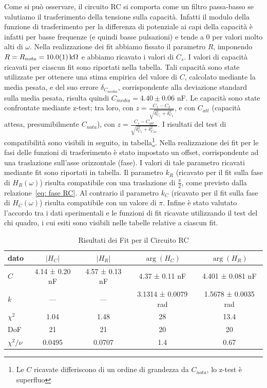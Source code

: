 \documentclass[a4paper]{article}
\begin{document}
Come si può osservare, il circuito RC si comporta come un filtro passa-basso se valutiamo il trasferimento della tensione sulla capacità.
Infatti il modulo della funzione di trasferimento per la differenza di potenziale ai capi della capacità è infatti per basse frequenze (e quindi basse pulsazioni) e tende a 0 per valori molto alti di $\omega$.
Nella realizzazione dei fit abbiamo fissato il parametro $R$, imponendo $R = R_{nota} = \SI{10.0 \pm 0.1}{k\ohm}$ e abbiamo ricavato i valori di $C_s$. 
I valori di capacità ricavati per ciascun fit sono riportati nella tabella.
Tali capacità sono state utilizzate per ottenere una stima empirica del valore di $C$, calcolato mediante la media pesata, e del suo errore $\delta_{C_{media}}$, corrispondente alla deviazione standard sulla media pesata, risulta quindi $C_{media} = 4.40 \pm 0.06$ nF.
Le capacità sono state confrontate mediante z-test; tra loro, con $z = \frac{C_1 - C_2}{\sqrt{\delta_{C_1}^2 + \delta_{C_2}^2}}$, e con $C_{att}$ (capacità attesa, presumibilmente $C_{nota}$), con $z = \frac{C_s - C_{att}}{\sqrt{\delta_{C_s}^2 + \delta_{C_{att}}^2}}$. I risultati del test di compatibilità sono visibili in seguito, in tabella\footnote{Le $C$ ricavate differiscono di un ordine di grandezza da $C_{nota}$, lo z-test è superfluo}.
Nella realizzazione dei fit per le fasi delle funzioni di trasferimento è stato impostato un offset, corrispondente ad una traslazione sull'asse orizzontale (fase). I valori di tale parametro ricavati mediante fit sono riportati in tabella. Il parametro $k_R$ (ricavato per il fit sulla fase di $H_R(\omega)$) risulta compatibile con una traslazione di $\frac{\pi}{2}$, come previsto dalla relazione~\eqref{eq: fase RC}. Al contrario il parametro $k_C$ (ricavato per il fit sulla fase di $H_C(\omega)$) risulta compatibile con un valore di $\pi$.
Infine è stato valutato l'accordo tra i dati sperimentali e le funzioni di fit ricavate utilizzando il test del chi quadro, i cui esiti sono visibili nelle tabelle relative a ciascun fit.
\begin{table}[htbp]
    \centering
    \begin{tabular}{|l|cccc|}
    \hline
    dato & $|H_C|$ & $|H_R|$ & $\arg(H_C)$ & $\arg(H_R)$ \\\hline\hline
    $C$ & 4.14 ± 0.20 nF & 4.57 ± 0.13 nF & 4.37 ± 0.11 nF & 4.401 ± 0.081 nF \\\hline
    $k$ & --- & --- & 3.1314 ± 0.0079 rad & 1.5678 ± 0.0035 rad \\\hline
    $\chi^2$ & 1.04 & 1.48 & 28 & 13.4 \\\hline
    DoF & 21 & 21 & 20 & 20 \\\hline
    $\chi^2/\nu$ & 0.0495 & 0.0707 & 1.4 & 0.67 \\\hline
    \end{tabular}
    \caption{Risultati dei Fit per il Circuito RC}
\end{table}
\end{document}
